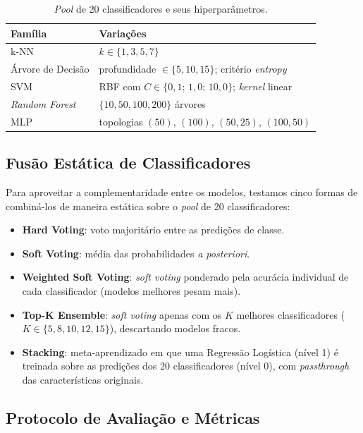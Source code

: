 \documentclass[12pt]{article}
\begin{document}
\begin{table}[H]
\centering
\caption{\textit{Pool} de 20 classificadores e seus hiperparâmetros.}
\label{tab:clf}
\begin{tabular}{lp{8.5cm}}
\toprule
Família & Variações \\
\midrule
k-NN & $k \in \{1,3,5,7\}$ \\
Árvore de Decisão & profundidade $\in \{5,10,15\}$; critério \textit{entropy} \\
SVM & RBF com $C \in \{0{,}1;\,1{,}0;\,10{,}0\}$; \textit{kernel} linear \\
\textit{Random Forest} & $\{10,50,100,200\}$ árvores \\
MLP & topologias $(50)$, $(100)$, $(50,25)$, $(100,50)$ \\
\bottomrule
\end{tabular}
\end{table}

\subsection{Fusão Estática de Classificadores}

Para aproveitar a complementaridade entre os modelos, testamos cinco formas de
combiná-los de maneira estática sobre o \textit{pool} de 20 classificadores:

\begin{itemize}
  \item \textbf{Hard Voting}: voto majoritário entre as predições de classe.
  \item \textbf{Soft Voting}: média das probabilidades \textit{a posteriori}.
  \item \textbf{Weighted Soft Voting}: \textit{soft voting} ponderado pela
        acurácia individual de cada classificador (modelos melhores pesam mais).
  \item \textbf{Top-K Ensemble}: \textit{soft voting} apenas com os $K$ melhores
        classificadores ($K \in \{5,8,10,12,15\}$), descartando modelos fracos.
  \item \textbf{Stacking}: meta-aprendizado em que uma Regressão Logística
        (nível 1) é treinada sobre as predições dos 20 classificadores (nível 0),
        com \textit{passthrough} das características originais.
\end{itemize}

\subsection{Protocolo de Avaliação e Métricas}
\end{document}
